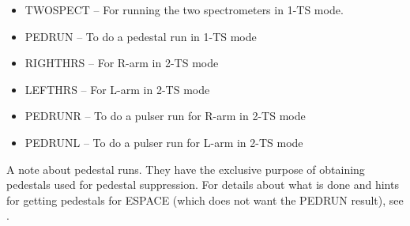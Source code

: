 {\begin{itemize} 
\item[~]TWOSPECT -- For running the two spectrometers in
1-TS mode.
\item[~]PEDRUN -- To do a pedestal run in 1-TS mode
\item[~]RIGHTHRS -- For R-arm in 2-TS mode
\item[~]LEFTHRS -- For L-arm in 2-TS mode
\item[~]PEDRUNR -- To do a pulser run for R-arm in 2-TS mode
\item[~]PEDRUNL -- To do a pulser run for L-arm in 2-TS mode
\end{itemize} 

\par 
A note about pedestal runs.  They have the exclusive
purpose of obtaining pedestals used for pedestal
suppression.  For details about what is done
and hints for getting pedestals for ESPACE (which
does not want the PEDRUN result), see .

}

